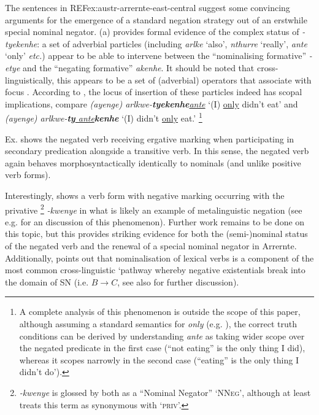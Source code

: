 \documentclass[output=paper]{langsci/langscibook}
\begin{document}
The sentences in REF{ex:austr-arrernte-east-central} suggest some
        convincing arguments for the emergence of a standard negation
        strategy out of an erstwhile special nominal negator. (a) provides
        formal evidence of the complex status of \textit{-tyekenhe}: a set
        of adverbial particles (including \textit{\textdblhyphen arlke}
        `also', \textit{\textdblhyphen nthurre} `really',
        \textit{\textdblhyphen ante} `only' \textit{etc.}) appear to be
        able to intervene between the ``nominalising formative''
        \textit{-etye} and the ``negating formative''
        \textit{\textdblhyphen akenhe}. It should be noted that
        cross-linguistically, this appears to be a set of (adverbial)
        operators that associate with focus
        \citep[e.g][]{Jackendoff1972,Rooth1985}. According to
        \citet[381]{Wilkins1989}, the locus of insertion of these particles
        indeed has scopal implications, compare \textit{(ayenge)
        arlkwe-\textbf{tyekenhe}\underline{\textdblhyphen ante}} `(I) \underline{only}
        didn't eat' and \textit{(ayenge)
        arlkwe-\textbf{ty}\underline{\guillemotleft
        ante\guillemotright}\textbf{kenhe}} `(I) didn't \underline{only} eat.'%
%
\footnote{A complete analysis of this phenomenon is outside the scope of this paper, although assuming a standard semantics for \textit{only} (e.g. \citealt{Horn1969}), the correct truth conditions can be derived by understanding \textit{\textdblhyphen ante} as taking wider scope over the negated predicate in the first case (``not eating'' is the only thing I did), whereas it scopes narrowly in the second case (``eating'' is the only thing I didn't do').}
 
Ex.  shows the negated verb receiving ergative marking when participating in secondary predication alongside a transitive verb. In this sense, the negated verb again behaves morphosyntactically identically to nominals (and unlike positive verb forms).

Interestingly,  shows a verb
form with negative marking occurring with the privative%
%
\footnote{\textit{-kwenye} is glossed by both \citealt{Henderson2013,Wilkins1989} as a ``Nominal Negator'' `\textsc{NNeg}', although at least \citealt[158]{Wilkins1989} treats this term as synonymous with `\textsc{priv}'.} 
%
\textit{-kwenye} in what is likely an example of metalinguistic negation (see e.g. \citealt[19]{HornWansing2017} for an discussion of this phenomenon). Further work remains to be done on this topic, but this provides striking evidence for both the (semi-)nominal status of the negated verb and the renewal of a special nominal negator in Arrernte. Additionally, \citet[171]{Veselinova2016} points out that nominalisation of lexical verbs is a component of the most common cross-linguistic `pathway whereby negative existentials break into the domain of SN (i.e. $B\to C$, see also  for further discussion).
\end{document}
